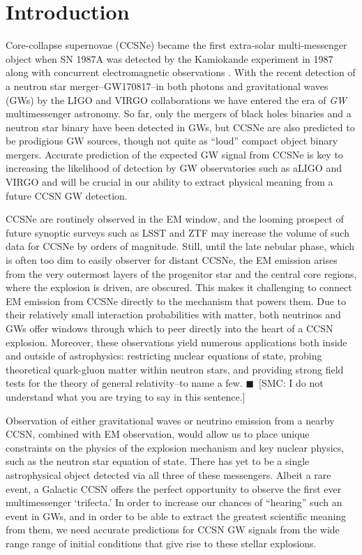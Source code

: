 \documentclass[twocolumn,times]{aastex62}  %
\newcommand{\smc}[1]{{\color{blue}$\blacksquare$~\textsf{[SMC: #1]}}}
\begin{document}
%

\section{Introduction}

Core-collapse supernovae (CCSNe) became the first extra-solar multi-messenger object when SN 1987A was detected by the Kamiokande experiment in 1987 \citep{hirata:1987} along with concurrent electromagnetic observations \citep[cf.][]{arnett:1989}. With the recent detection of a neutron star merger--GW170817--in both photons and gravitational waves (GWs) by the LIGO and VIRGO collaborations \citep{abbott:2016} we have entered the era of {\it GW} multimessenger astronomy.  
So far, only the mergers of black holes binaries and a neutron star binary have been detected in GWs, but CCSNe are also predicted to be prodigious GW sources, though not quite as ``loud'' compact object binary mergers.
Accurate prediction of the expected GW signal from CCSNe is key to increasing the likelihood of detection by GW observatories such as aLIGO and VIRGO and will be crucial in our ability to extract physical meaning from a future CCSN GW detection.

CCSNe are routinely observed in the EM window, and the looming prospect of future synoptic surveys such as LSST and ZTF may increase the volume of such data for CCSNe by orders of magnitude.
Still, until the late nebular phase, which is often too dim to easily observer for distant CCSNe, the EM emission arises from the very outermost layers of the progenitor star and the central core regions, where the explosion is driven, are obscured. 
This makes it challenging to connect EM emission from CCSNe directly to the mechanism that powers them.
Due to their relatively small interaction probabilities with matter, both neutrinos and GWs offer windows through which to peer directly into the heart of a CCSN explosion.  
Moreover, these observations yield numerous applications both inside and outside of astrophysics: restricting nuclear equations of state, probing theoretical quark-gluon matter within neutron stars, and providing strong field tests for the theory of general relativity--to name a few. \smc{I do not understand what you are trying to say in this sentence.}

Observation of either gravitational waves or neutrino emission from a nearby CCSN, combined with EM observation, would allow us to place unique constraints on the physics of the explosion mechanism and key nuclear physics, such as the neutron star equation of state.  
There has yet to be a single astrophysical object detected via all three of these messengers.  
Albeit a rare event, a Galactic CCSN offers the perfect opportunity to observe the first ever multimessenger `trifecta.'  
In order to increase our chances of ``hearing'' such an event in GWs, and in order to be able to extract the greatest scientific meaning from them, we need accurate predictions for CCSN GW signals from the wide range range of initial conditions that give rise to these stellar explosions.
\end{document}
